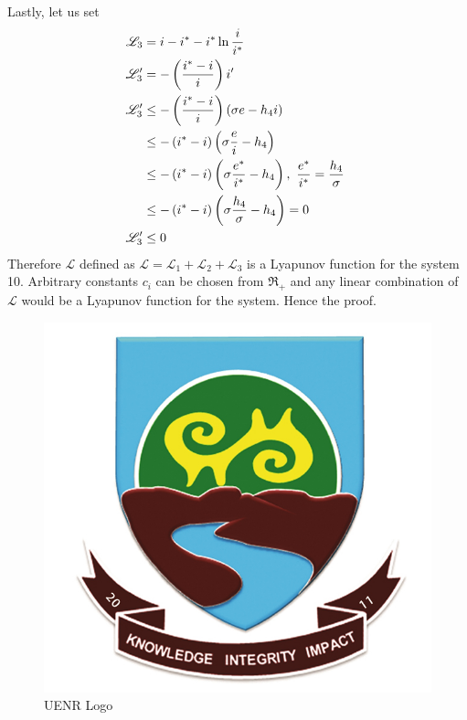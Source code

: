 Lastly, let us set 
\begin{equation}
\begin{aligned}
\mathscr{L}_{3} &= i - i^{*} - i^{*}\ln\frac{i}{i^{*}}\\
\mathscr{L}_{3}' &= -\left(\dfrac{i^{*} - i}{i}\right) i'\\
\mathscr{L}_{3}' &\leq -\left(\dfrac{i^{*} - i}{i}\right) (\sigma e - h_{4}i )\\
&\leq -\left(i^{*} - i\right) \left(\sigma\dfrac{e}{i} - h_{4} \right)\\
&\leq -\left(i^{*} - i\right) \left(\sigma\dfrac{e^{*}}{i^{*}} - h_{4} \right), \text{ $ \dfrac{e^{*}}{i^{*}} = \dfrac{h_{4}}{\sigma}$ } \\
&\leq -\left(i^{*} - i\right) \left(\sigma\dfrac{h_{4}}{\sigma} - h_{4} \right) = 0\\
\mathscr{L}_{3}'&\leq 0
\end{aligned}
\end{equation}
Therefore $ \mathscr{L} $ defined as $ \mathscr{L} = \mathscr{L}_{1} + \mathscr{L}_{2}  + \mathscr{L}_{3} $ is a Lyapunov function for the system 10. Arbitrary constants $ c_{i} $ can be chosen from $ \Re_{+} $ and any linear combination of $ \mathscr{L} $ would be a Lyapunov function for the system. Hence the proof.


\begin{figure}
	\centering
	\includegraphics[width=0.7\linewidth]{images/Logo2}
	\caption{UENR Logo}
	\label{fig:logo2}
\end{figure}



